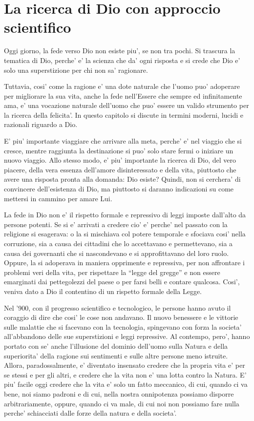 \chapter{La ricerca di Dio con approccio scientifico}
\label{chapterDio}

Oggi giorno, la fede verso Dio non esiste piu', se non tra pochi. Si trascura la tematica di Dio, perche' e' la scienza che da' ogni risposta e si crede che Dio e' solo una superstizione per chi non sa' ragionare.

Tuttavia, cosi' come la ragione e' una dote naturale che l'uomo puo' adoperare per migliorare la sua vita, anche la fede nell'Essere che sempre ed infinitamente ama, e' una vocazione naturale dell'uomo che puo' essere un valido strumento per la ricerca della felicita'. In questo capitolo si discute in termini moderni, lucidi e razionali riguardo a Dio.

E' piu' importante viaggiare che arrivare alla meta, perche' e' nel viaggio che si cresce, mentre raggiunta la destinazione si puo' solo stare fermi o iniziare un nuovo viaggio. Allo stesso modo, e' piu' importante la ricerca di Dio, del vero piacere, della vera essenza dell'amore disinteressato e della vita, piuttosto che avere una risposta pronta alla domanda: Dio esiste? Quindi, non si cerchera' di convincere dell'esistenza di Dio, ma piuttosto si daranno indicazioni su come mettersi in cammino per amare Lui.

La fede in Dio non e' il rispetto formale e repressivo di leggi imposte dall'alto da persone potenti. Se si e' arrivati a credere cio' e' perche' nel passato con la religione si esagerava: o la si mischiava col potere temporale e sfociava cosi' nella corruzione, sia a causa dei cittadini che lo accettavano e permettevano, sia a causa dei governanti che si nascondevano e si approfittavano del loro ruolo. Oppure, la si adoperava in maniera opprimente e repressiva, per non affrontare i problemi veri della vita, per rispettare la ``legge del gregge'' e non essere emarginati dai pettegolezzi del paese o per farsi belli e contare qualcosa. Cosi', veniva dato a Dio il contentino di un rispetto formale della Legge.

Nel '900, con il progresso scientifico e tecnologico, le persone hanno avuto il coraggio di dire che cosi' le cose non andavano. Il nuovo benessere e le vittorie sulle malattie che si facevano con la tecnologia, spingevano con forza la societa' all'abbandono delle sue superstizioni e leggi repressive. Al contempo, pero', hanno portato con se' anche l'illusione del dominio dell'uomo sulla Natura e della superiorita' della ragione sui sentimenti e sulle altre persone meno istruite. Allora, paradossalmente, e' diventato insensato credere che la propria vita e' per se stessi e per gli altri, e credere che la vita non e' una lotta contro la Natura. E' piu' facile oggi credere che la vita e' solo un fatto meccanico, di cui, quando ci va bene, noi siamo padroni e di cui, nella nostra onnipotenza possiamo disporre arbitrariamente, oppure, quando ci va male, di cui noi non possiamo fare nulla perche' schiacciati dalle forze della natura e della societa'.

